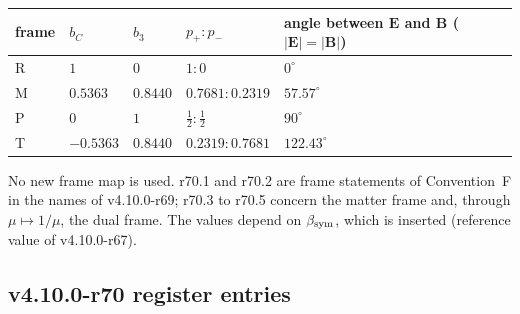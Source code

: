 \begin{center}
\small
\begin{tabular}{@{}>{\raggedright\arraybackslash}p{}>{\raggedright\arraybackslash}p{}>{\raggedright\arraybackslash}p{}>{\raggedright\arraybackslash}p{}>{\raggedright\arraybackslash}p{}@{}}
\toprule
frame & \(b_C\) & \(b_3\) & \(p_+:p_-\) & angle between \(\mathbf E\) and \(\mathbf B\) (\(|\mathbf E|=|\mathbf B|\))\\
\midrule
R & \(1\) & \(0\) & \(1:0\) & \(0^\circ\)\\
M & \(0.5363\) & \(0.8440\) & \(0.7681:0.2319\) & \(57.57^\circ\)\\
P & \(0\) & \(1\) & \(\tfrac12:\tfrac12\) & \(90^\circ\)\\
T & \(-0.5363\) & \(0.8440\) & \(0.2319:0.7681\) & \(122.43^\circ\)\\
\bottomrule
\end{tabular}
\end{center}
No new frame map is used.  r70.1 and r70.2 are frame statements of Convention~F in the names of v4.10.0-r69; r70.3 to r70.5 concern the matter
frame and, through \(\mu\mapsto1/\mu\), the dual frame.  The values depend on \(\beta_{\mathrm{sym}}\), which is inserted (reference value of v4.10.0-r67).

\subsection*{v4.10.0-r70 register entries}
\label{subsec:v4100-r70-register}

